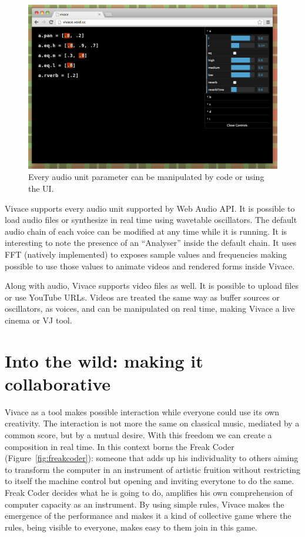 \documentclass[letterpaper, 12pt]{article}
\begin{document}
\begin{figure}[htpb]
  \begin{center}
    \includegraphics[scale=.3]{img/fig_ui.png}
    \caption{Every audio unit parameter can be manipulated by code or
      using the UI.}
    \label{fig:ui}
  \end{center}
\end{figure}

Vivace supports every audio unit supported by Web Audio API. It is
possible to load audio files or synthesize in real time using
wavetable oscillators. The default audio chain of each voice can be
modified at any time while it is running. It is interesting to note
the presence of an ``Analyser'' inside the default chain. It uses FFT
(natively implemented) to exposes sample values and frequencies making
possible to use those values to animate videos and rendered forms
inside Vivace.

Along with audio, Vivace supports video files as well. It is possible
to upload files or use YouTube URLs. Videos are treated the same way
as buffer sources or oscillators, as voices, and can be manipulated on
real time, making Vivace a live cinema or VJ tool.

\section{Into the wild: making it collaborative}
\label{freakcoding}

Vivace as a tool makes possible interaction while everyone could use
its own creativity. The interaction is not more the same on classical
music, mediated by a common score, but by a mutual desire. With this
freedom we can create a composition in real time. In this context
borns the Freak Coder (Figure~\ref{fig:freakcoder}): someone that adds
up his individuality to others aiming to transform the computer in an
instrument of artistic fruition without restricting to itself the
machine control but opening and inviting everytone to do the
same. Freak Coder decides what he is going to do, amplifies his own
comprehension of computer capacity as an instrument. By using simple
rules, Vivace makes the emergence of the performance and makes it a
kind of collective game where the rules, being visible to everyone,
makes easy to them join in this game.
\end{document}
